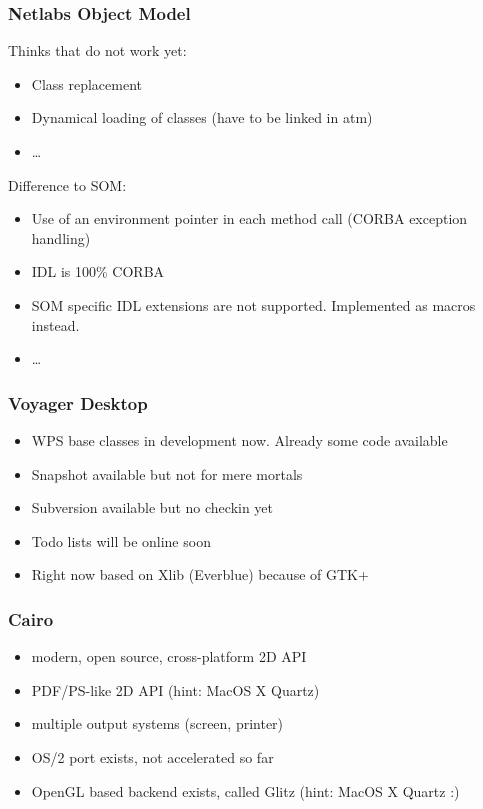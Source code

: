 \documentclass{beamer}
\begin{document}
\begin{frame}
\frametitle{Netlabs Object Model}
Thinks that do not work yet:
\begin{itemize}[<+->]
  \item Class replacement
  \item Dynamical loading of classes (have to be linked in atm)
  \item \ldots
\end{itemize}
Difference to SOM:
\begin{itemize}[<+->]
  \item Use of an environment pointer in each method call (CORBA exception
  handling)
  \item IDL is 100\% CORBA
  \item SOM specific IDL extensions are not supported. Implemented as macros
  instead.
  \item \ldots
\end{itemize}
\end{frame}

\begin{frame}
\frametitle{Voyager Desktop}
\begin{itemize}[<+->]
  \item WPS base classes in development now. Already some code available
  \item Snapshot available but not for mere mortals
  \item Subversion available but no checkin yet
  \item Todo lists will be online soon
  \item Right now based on Xlib (Everblue) because of GTK+
\end{itemize}
\end{frame}

\begin{frame}
\frametitle{Cairo}
\begin{itemize}[<+->]
  \item modern, open source, cross-platform 2D API
  \item PDF/PS-like 2D API (hint: MacOS X Quartz)
  \item multiple output systems (screen, printer)
  \item OS/2 port exists, not accelerated so far
  \item OpenGL based backend exists, called Glitz (hint: MacOS X Quartz :)
\end{itemize}
\end{frame}
\end{document}
